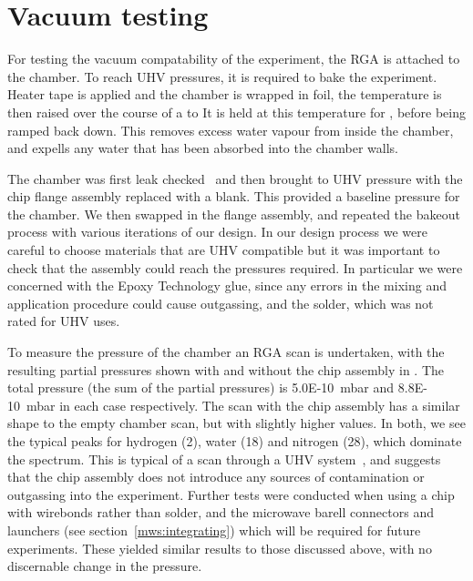 \section{Vacuum testing}

For testing the vacuum compatability of the experiment, the RGA is attached to
the chamber. To reach UHV pressures, it is required to bake the experiment.
Heater tape is applied and the chamber is wrapped in foil, the temperature is
then raised over the course of a  to   It
is held at this temperature for , before being ramped back
down. This removes excess water vapour from inside the chamber, and expells any
water that has been absorbed into the chamber walls.

The chamber was first leak checked~\cite{} and then brought to UHV pressure
with the chip flange assembly replaced with a blank. This provided a baseline
pressure for the chamber. We then swapped in the flange assembly, and repeated
the bakeout process with various iterations of our design. In our design
process we were careful to choose materials that are UHV compatible but it was
important to check that the assembly could reach the pressures required. In
particular we were concerned with the Epoxy Technology glue, since any errors
in the mixing and application procedure could cause outgassing, and the solder,
which was not rated for UHV uses.

To measure the pressure of the chamber an RGA scan is undertaken, with the
resulting partial pressures shown with and without the chip assembly in
. The total pressure (the sum of the partial pressures)
is \SI{5.0E-10}{\milli\bar} and \SI{8.8E-10}{\milli\bar} in each case respectively. The scan with the chip assembly
has a similar shape to the empty chamber scan, but with slightly higher values.
In both, we see the typical peaks for hydrogen (2), water (18) and nitrogen
(28), which dominate the spectrum. This is typical of a scan through a UHV
system~\cite{}, and suggests that the chip assembly does not introduce any
sources of contamination or outgassing into the experiment.
%
Further tests were conducted when using a chip with wirebonds rather than
solder, and the microwave barell connectors and launchers (see
section~\ref{mws:integrating}) which will be required for future experiments.
These yielded similar results to those discussed above, with no discernable
change in the pressure.

